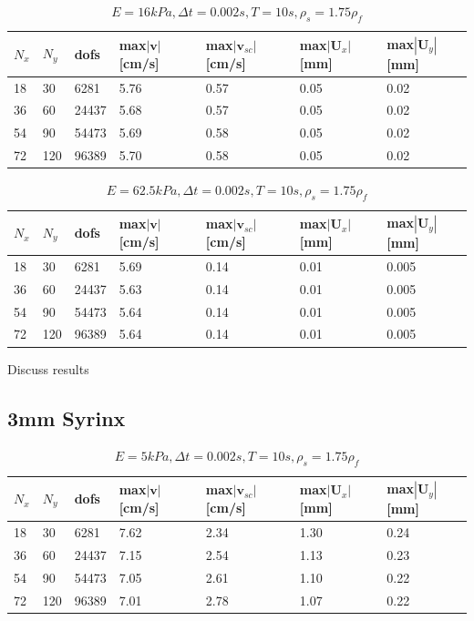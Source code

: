 \begin{table}[!h]
\begin{center}
  \begin{tabular}{l | l | l | l | l | l | l }
    $N_x$ & $N_y$ & dofs & max$|\mathbf{v}|$[cm/s] & max$|\mathbf{v}_{sc}|$[cm/s] & max$|\mathbf{U}_x|$[mm] & max$|\mathbf{U}_y|$[mm] \\ \hline
    18  & 30 & 6281 & 5.76 & 0.57 & 0.05 & 0.02 \\ \hline
	36 & 60 & 24437 & 5.68 & 0.57 & 0.05 & 0.02 \\ \hline
	54 & 90 & 54473 & 5.69 & 0.58 & 0.05 & 0.02 \\ \hline
	72 & 120 & 96389& 5.70 & 0.58 & 0.05 & 0.02 \\ \hline
    \hline
  \end{tabular}
  \end{center}
  \caption{$E = 16 kPa, \Delta t = 0.002s, T = 10s, \rho_s = 1.75 \rho_f$}
\end{table}


\begin{table}[!h]
\begin{center}
  \begin{tabular}{l | l | l | l | l | l | l }
    $N_x$ & $N_y$ & dofs & max$|\mathbf{v}|$[cm/s] & max$|\mathbf{v}_{sc}|$[cm/s] & max$|\mathbf{U}_x|$[mm] & max$|\mathbf{U}_y|$[mm] \\ \hline
    18  & 30 & 6281 & 5.69 & 0.14 & 0.01 & 0.005 \\ \hline
	36 & 60 & 24437 & 5.63 & 0.14 & 0.01 & 0.005 \\ \hline
	54 & 90 & 54473 & 5.64 & 0.14 & 0.01 &  0.005 \\ \hline
	72 & 120 & 96389& 5.64 & 0.14 & 0.01 & 0.005 \\ \hline
    \hline
  \end{tabular}
  \end{center}
  \caption{$E = 62.5 kPa, \Delta t = 0.002s, T = 10s, \rho_s = 1.75 \rho_f$}
\end{table}
Discuss results
\subsection{3mm Syrinx}
\begin{table}[!h]
\begin{center}
  \begin{tabular}{l | l | l | l | l | l | l }
    $N_x$ & $N_y$ & dofs & max$|\mathbf{v}|$[cm/s] & max$|\mathbf{v}_{sc}|$[cm/s] & max$|\mathbf{U}_x|$[mm] & max$|\mathbf{U}_y|$[mm] \\ \hline
    18  & 30 & 6281 & 7.62 & 2.34 & 1.30 & 0.24 \\ \hline
	36 & 60 & 24437 & 7.15 & 2.54 & 1.13 & 0.23 \\ \hline
	54 & 90 & 54473 & 7.05 & 2.61 & 1.10 &  0.22 \\ \hline
	72 & 120& 96389 & 7.01 & 2.78 & 1.07 & 0.22 \\ \hline
    \hline
  \end{tabular}
  \end{center}
  \caption{$E = 5 kPa, \Delta t = 0.002s, T = 10s, \rho_s = 1.75 \rho_f$}
\end{table}

